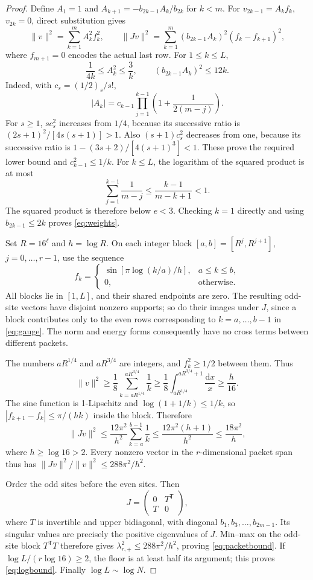\documentclass[10pt]{article}
\newcommand{\dd}{\mathrm d}
\begin{document}
\begin{proof}
Define $A_1=1$ and $A_{k+1}=-b_{2k-1}A_k/b_{2k}$ for $k<m$.
For $v_{2k-1}=A_kf_k$, $v_{2k}=0$, direct substitution gives
\begin{equation}
\|v\|^2=\sum_{k=1}^m A_k^2f_k^2,\qquad
\|Jv\|^2=\sum_{k=1}^m(b_{2k-1}A_k)^2(f_k-f_{k+1})^2,
\label{eq:gauge}
\end{equation}
where $f_{m+1}=0$ encodes the actual last row. For $1\le k\le L$,
\begin{equation}
\frac1{4k}\le A_k^2\le\frac3k,
\qquad (b_{2k-1}A_k)^2\le12k.\label{eq:weights}
\end{equation}
Indeed, with $c_s=(1/2)_s/s!$,
\[
|A_k|=c_{k-1}\prod_{j=1}^{k-1}\left(1+\frac1{2(m-j)}\right).
\]
For $s\ge1$, $s c_s^2$ increases from $1/4$, because its successive
ratio is $(2s+1)^2/[4s(s+1)]>1$. Also $(s+1)c_s^2$ decreases from one,
because its successive ratio is $1-(3s+2)/[4(s+1)^3]<1$.
These prove the required lower bound and $c_{k-1}^2\le1/k$.
For $k\le L$, the logarithm of the squared product is at most
\[
\sum_{j=1}^{k-1}\frac1{m-j}\le\frac{k-1}{m-k+1}<1.
\]
The squared product is therefore below $e<3$. Checking $k=1$ directly and using
$b_{2k-1}\le2k$ proves \eqref{eq:weights}.

Set $R=16^\ell$ and $h=\log R$. On each integer block
$[a,b]=[R^j,R^{j+1}]$, $j=0,\ldots,r-1$, use the sequence
\[
f_k=\begin{cases}
\sin[\pi\log(k/a)/h],&a\le k\le b,\\
0,&\text{otherwise}.
\end{cases}
\]
All blocks lie in $[1,L]$, and their shared endpoints are zero.
The resulting odd-site vectors have disjoint nonzero supports; so do
their images under $J$, since a block contributes only to the even
rows corresponding to $k=a,\ldots,b-1$ in \eqref{eq:gauge}.
The norm and energy forms consequently have no cross terms between
different packets.

The numbers $aR^{1/4}$ and $aR^{3/4}$ are integers, and $f_k^2\ge1/2$
between them. Thus
\[
\|v\|^2\ge\frac18\sum_{k=aR^{1/4}}^{aR^{3/4}}\frac1k
\ge\frac18\int_{aR^{1/4}}^{aR^{3/4}+1}\frac{\dd x}{x}
\ge\frac h{16}.
\]
The sine function is 1-Lipschitz and $\log(1+1/k)\le1/k$, so
$|f_{k+1}-f_k|\le\pi/(hk)$ inside the block. Therefore
\[
\|Jv\|^2\le\frac{12\pi^2}{h^2}\sum_{k=a}^{b-1}\frac1k
\le\frac{12\pi^2(h+1)}{h^2}\le\frac{18\pi^2}{h},
\]
where $h\ge\log16>2$. Every nonzero vector in the $r$-dimensional
packet span thus has $\|Jv\|^2/\|v\|^2\le288\pi^2/h^2$.

Order the odd sites before the even sites. Then
\[
J=\begin{pmatrix}0&T^{\mathsf T}\\T&0\end{pmatrix},
\]
where $T$ is invertible and upper bidiagonal, with diagonal
$b_1,b_3,\ldots,b_{2m-1}$. Its singular values are precisely the
positive eigenvalues of $J$. Min--max on the odd-site block
$T^{\mathsf T}T$ therefore gives
$\lambda_{r,+}^2\le288\pi^2/h^2$, proving \eqref{eq:packetbound}.
If $\log L/(r\log16)\ge2$, the floor is at least half its argument;
this proves \eqref{eq:logbound}. Finally $\log L\sim\log N$.
\end{proof}
\end{document}
